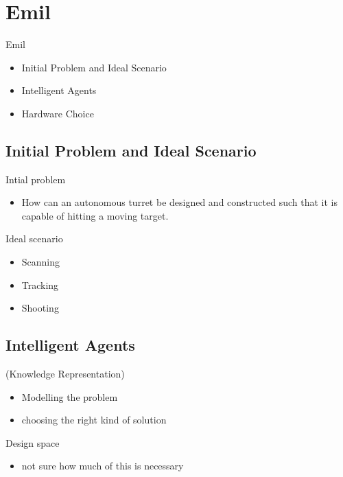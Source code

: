 \section{Emil}
\begin{frame}{Emil}
\begin{itemize}
  \item Initial Problem and Ideal Scenario
  \item Intelligent Agents
  \item Hardware Choice
\end{itemize}
\end{frame}

\subsection{Initial Problem and Ideal Scenario}
\begin{frame}{Intial problem}
\begin{itemize}
\item How can an autonomous turret be designed and constructed such
that it is capable of hitting a moving target.
\end{itemize}
\end{frame}

\begin{frame}{Ideal scenario}
\begin{itemize}
  \item Scanning
  \item Tracking
  \item Shooting
\end{itemize}
\end{frame}

\subsection{Intelligent Agents}
\begin{frame}(Knowledge Representation)
\begin{itemize}
  \item Modelling the problem
  \item choosing the right kind of solution
\end{itemize}
\end{frame}

\begin{frame}{Design space}
\begin{itemize}
 \item not sure how much of this is necessary
\end{itemize}
\end{frame}

